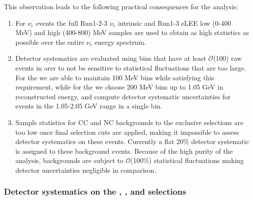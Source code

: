 \par This observation leads to the following practical consequences for the analysis:
\begin{enumerate}
    \item For $\nu_e$ events the full Run1-2-3 $\nu_e$ intrinsic and Run1-3 eLEE low (0-400 MeV) and high (400-800) MeV samples are used to obtain as high statistics as possible over the entire $\nu_e$ energy spectrum.
    \item Detector systematics are evaluated using bins that have at least $\mathcal{O}$(100) raw events in orer to not be sensitive to statistical fluctuations that are too large. For the \npsel we are able to maintain 100 MeV bins while satisfying this requirement, while for the \zpsel we choose 200 MeV bins up to 1.05 GeV in reconstructed energy, and compute detector systematic uncertainties for events in the 1.05-2.05 GeV range in a single bin.
    \item Sample statistics for \numu CC and NC backgrounds to the exclusive \nue selections are too low once final selection cuts are applied, making it impossible to assess detector systematics on these events. Currently a flat 20\% detector systematic is assigned to these background events. Because of the high purity of the analysis, backgrounds are subject to $\mathcal{O}$(100\%) statistical fluctuations making detector uncertainties negligible in comparison.
\end{enumerate}

\subsubsection{Detector systematics on the \npsel, \zpsel, and \numu selections}
\label{sec:detsys:selections}

